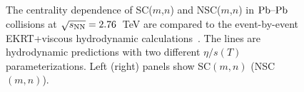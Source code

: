 \begin{figure}[!]
            \begin{center}
              \end{center}
        \caption{The centrality dependence of SC($m$,$n$) and NSC($m$,$n$) in $\textnormal{Pb--Pb}$ collisions at $\sqrt{s_{\textnormal{NN}}}=2.76$~TeV are compared to the event-by-event EKRT+viscous hydrodynamic calculations~\cite{Niemi:2015qia}. The lines are hydrodynamic predictions with two different $\eta/s(T)$ parameterizations. Left (right) panels show SC$(m,n)$ (NSC$(m,n)$).}        
        \label{fig:Figure_3}
\end{figure}

